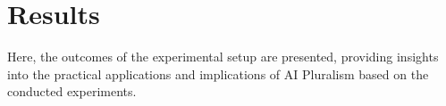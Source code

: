 \section{Results}
Here, the outcomes of the experimental setup are presented, providing insights into the practical applications and implications of AI Pluralism based on the conducted experiments.
